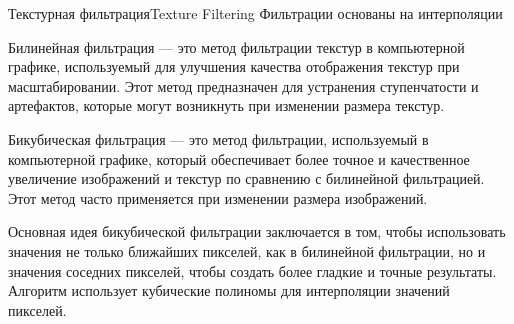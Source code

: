 \documentclass{beamer}
\begin{document}
	\begin{frame}{Текстурная фильтрация}{Texture Filtering}
		Фильтрации основаны на интерполяции
		
		Билинейная фильтрация --- это метод фильтрации текстур в компьютерной графике, используемый для улучшения качества отображения текстур при масштабировании. Этот метод предназначен для устранения ступенчатости и артефактов, которые могут возникнуть при изменении размера текстур.


		Бикубическая фильтрация --- это метод фильтрации, используемый в компьютерной графике, который обеспечивает более точное и качественное увеличение изображений и текстур по сравнению с билинейной фильтрацией. Этот метод часто применяется при изменении размера изображений.

		{\footnotesize
			Основная идея бикубической фильтрации заключается в том, чтобы использовать значения не только ближайших пикселей, как в билинейной фильтрации, но и значения соседних пикселей, чтобы создать более гладкие и точные результаты. Алгоритм использует кубические полиномы для интерполяции значений пикселей.
		}



	\end{frame}
\end{document}

